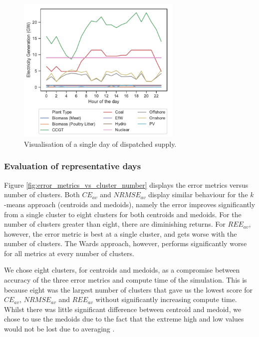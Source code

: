 \begin{figure}
	\centering
	\includegraphics[width=0.7\textwidth]{Chapter4/figures/e-Energy-2020/methods_and_materials/clusters_results_single_day.pdf}
	\caption{Visualisation of a single day of dispatched supply.}
	\label{fig:single_dispatched_day}
\end{figure}


\subsubsection{Evaluation of representative days}
\label{ssec:res_repr_days}

Figure \ref{fig:error_metrics_vs_cluster_number} displays the error metrics versus number of clusters. Both $CE_{av}$ and $NRMSE_{av}$ display similar behaviour for the $k$-means approach (centroids and medoids), namely the error improves significantly from a single cluster to eight clusters for both centroids and medoids. For the number of clusters greater than eight, there are diminishing returns. For $REE_{av}$, however, the error metric is best at a single cluster, and gets worse with the number of clusters. The Wards approach, however, performs significantly worse for all metrics at every number of clusters. 



We chose eight clusters, for centroids and medoids, as a compromise between accuracy of the three error metrics and compute time of the simulation. This is because eight was the largest number of clusters that gave us the lowest score for $CE_{av}$, $NRMSE_{av}$ and $REE_{av}$ without significantly increasing compute time. Whilst there was little significant difference between centroid and medoid, we chose to use the medoids due to the fact that the extreme high and low values would not be lost due to averaging \cite{Hilbers2019}.



